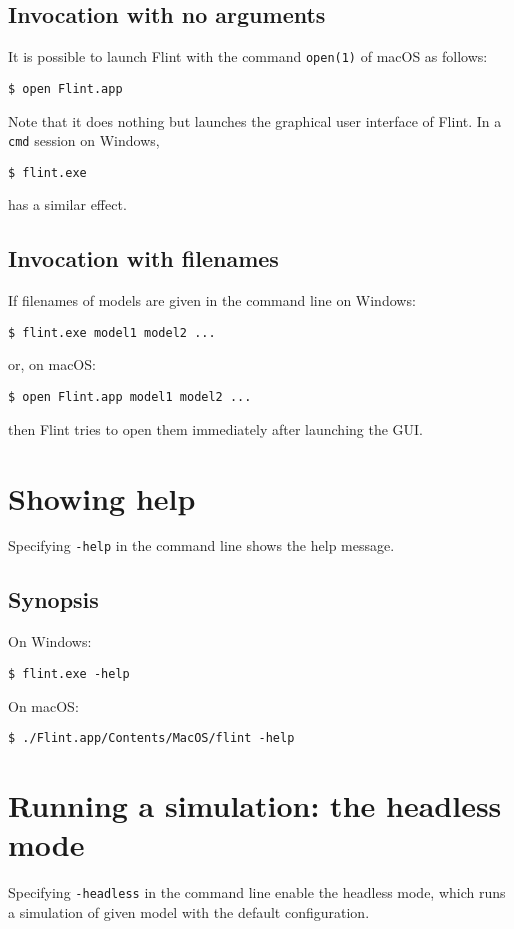 \documentclass[a4paper,10pt]{report}
\begin{document}
\subsection{Invocation with no arguments}
It is possible to launch Flint with the command {\tt open(1)} of macOS as follows:
\begin{verbatim}
$ open Flint.app
\end{verbatim}
Note that it does nothing but launches the graphical user interface of Flint.
In a {\tt cmd} session on Windows,
\begin{verbatim}
$ flint.exe
\end{verbatim}
has a similar effect.

\subsection{Invocation with filenames}
If filenames of models are given in the command line on Windows:
\begin{verbatim}
$ flint.exe model1 model2 ...
\end{verbatim}
or, on macOS:
\begin{verbatim}
$ open Flint.app model1 model2 ...
\end{verbatim}
then Flint tries to open them immediately after launching the GUI.

\section{Showing help}
Specifying {\tt -help} in the command line shows the help message.

\subsection{Synopsis}
On Windows:
\begin{verbatim}
$ flint.exe -help
\end{verbatim}
On macOS:
\begin{verbatim}
$ ./Flint.app/Contents/MacOS/flint -help
\end{verbatim}

\section{Running a simulation: the headless mode}
Specifying {\tt -headless} in the command line enable the headless mode, which
runs a simulation of given model with the default configuration.
\end{document}
